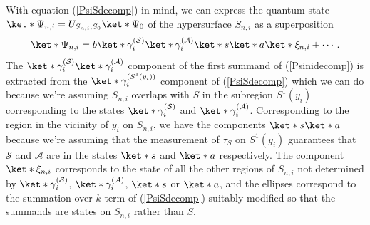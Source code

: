 \documentclass[12pt]{report}
\begin{document}
With equation (\ref{PsiSdecomp}) in mind, we can express the quantum state $\ket*{\Psi_{n,i}}=U_{S_{n,i},S_0}\ket*{\Psi_0}$ %
%
of the hypersurface $S_{n,i}$ as a superposition 
\begin{equation}\label{Psinidecomp}
\ket*{\Psi_{n,i}}=b\ket*{\gamma_i^{(\mathcal{S})}}\ket*{\gamma_i^{(\mathcal{A})}}\ket*{s}\ket*{a}\ket*{\xi_{n,i}}+\cdots.
\end{equation} 
The $\ket*{\gamma_i^{(\mathcal{S})}}\ket*{\gamma_i^{(\mathcal{A})}}$ component of the first summand of (\ref{Psinidecomp}) is extracted from the $\ket*{\gamma_i^{(S^1(y_i))}}$ component of (\ref{PsiSdecomp}) which we can do because we're assuming $S_{n,i}$ overlaps with $S$ in the subregion $S^1(y_i)$ corresponding to the states $\ket*{\gamma_i^{(\mathcal{S})}}$ and $\ket*{\gamma_i^{(\mathcal{A})}}$. Corresponding to the region in the vicinity of $y_i$ on $S_{n,i}$, we have the components $\ket*{s}\ket*{a}$ because we're assuming that the measurement of $\tau_S$ on $S^1(y_i)$ guarantees that $\mathcal{S}$ and $\mathcal{A}$ are in the states $\ket*{s}$ and $\ket*{a}$ respectively. The component $\ket*{\xi_{n,i}}$ %
%
 corresponds to the state of all the other regions of $S_{n,i}$ not determined by $\ket*{\gamma_i^{(\mathcal{S})}}$, $\ket*{\gamma_i^{(\mathcal{A})}}$, $\ket*{s}$ or $\ket*{a}$, and the ellipses correspond to the summation over $k$ term of (\ref{PsiSdecomp}) suitably modified so that the summands are states on $S_{n,i}$ rather than $S$.
\end{document}
